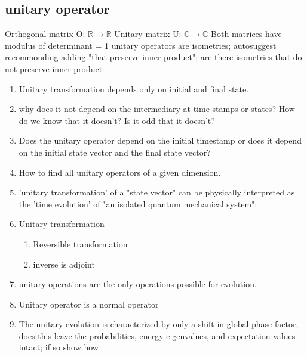 \documentclass{article}
\begin{document}
    \subsection{unitary operator}
    Orthogonal matrix O: $\mathbb{R} \rightarrow \mathbb{R}$
    Unitary matrix U: $\mathbb{C} \rightarrow \mathbb{C}$ 
    Both matrices have modulus of determinant = 1 
    unitary operators are isometries; autosuggest recommonding adding "that preserve inner product"; are there isometries that do not preserve inner product

    \begin{enumerate}    
    \item Unitary transformation depends only on initial and final state.
    \item why does it not depend on the intermediary at time stamps or states? How do we know that it doesn't? Is it odd that it doesn't?

    \item Does the unitary operator depend on the initial timestamp or does it depend on the initial state vector and the final state vector?
    
    \item How to find all unitary operators of a given dimension.
    
    \item 'unitary transformation' of a "state vector" can be physically interpreted as the 'time evolution' of "an isolated quantum mechanical system":
    \item Unitary transformation
    \begin{enumerate} %
        \item Reversible transformation
        \item inverse is adjoint
    \end{enumerate}

    \item unitary operations are the only operations possible for evolution.
    \item Unitary operator is a normal operator
    \item The unitary evolution is characterized by only a shift in global phase factor; does this leave the probabilities, energy eigenvalues, and expectation values intact; if so show how

    \end{enumerate}
    
\end{document}
